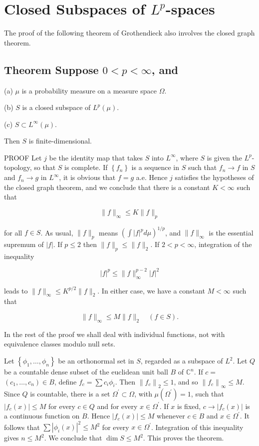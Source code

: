 \documentclass[10pt]{article}
\begin{document}
\section{Closed Subspaces of $L^{p}$-spaces}
The proof of the following theorem of Grothendieck also involves the closed graph theorem.

\subsection{Theorem Suppose $0<p<\infty$, and}
(a) $\mu$ is a probability measure on a measure space $\Omega$.

(b) $S$ is a closed subspace of $L^{p}(\mu)$.

(c) $S \subset L^{\infty}(\mu)$.

Then $S$ is finite-dimensional.

PROOF Let $j$ be the identity map that takes $S$ into $L^{\infty}$, where $S$ is given the $L^{p}$-topology, so that $S$ is complete. If $\left\{f_{n}\right\}$ is a sequence in $S$ such that $f_{n} \rightarrow f$ in $S$ and $f_{n} \rightarrow g$ in $L^{\infty}$, it is obvious that $f=g$ a.e. Hence $j$ satisfies the hypotheses of the closed graph theorem, and we conclude that there is a constant $K<\infty$ such that

$$
\|f\|_{\infty} \leq K\|f\|_{p}
$$

for all $f \in S$. As usual, $\|f\|_{p}$ means $\left(\int|f|^{p} d \mu\right)^{1 / p}$, and $\|f\|_{\infty}$ is the essential supremum of $|f|$. If $p \leq 2$ then $\|f\|_{p} \leq\|f\|_{2}$. If $2<p<\infty$, integration of the inequality

$$
|f|^{p} \leq\|f\|_{\infty}^{p-2}|f|^{2}
$$

leads to $\|f\|_{\infty} \leq K^{p / 2}\|f\|_{2}$. In either case, we have a constant $M<\infty$ such that

$$
\|f\|_{\infty} \leq M\|f\|_{2} \quad(f \in S) .
$$

In the rest of the proof we shall deal with individual functions, not with equivalence classes modulo null sets.

Let $\left\{\phi_{1}, \ldots, \phi_{n}\right\}$ be an orthonormal set in $S$, regarded as a subspace of $L^{2}$. Let $Q$ be a countable dense subset of the euclidean unit ball $B$ of $\mathbb{C}^{n}$. If $c=$ $\left(c_{1}, \ldots, c_{n}\right) \in B$, define $f_{c}=\sum c_{i} \phi_{i}$. Then $\left\|f_{c}\right\|_{2} \leq 1$, and so $\left\|f_{c}\right\|_{\infty} \leq M$. Since $Q$ is countable, there is a set $\Omega^{\prime} \subset \Omega$, with $\mu\left(\Omega^{\prime}\right)=1$, such that $\left|f_{c}(x)\right| \leq M$ for every $c \in Q$ and for every $x \in \Omega^{\prime}$. If $x$ is fixed, $c \rightarrow\left|f_{c}(x)\right|$ is a continuous function on $B$. Hence $\left|f_{c}(x)\right| \leq M$ whenever $c \in B$ and $x \in \Omega^{\prime}$. It follows that $\sum\left|\phi_{i}(x)\right|^{2} \leq M^{2}$ for every $x \in \Omega^{\prime}$. Integration of this inequality gives $n \leq M^{2}$. We conclude that $\operatorname{dim} S \leq M^{2}$. This proves the theorem.
\end{document}
